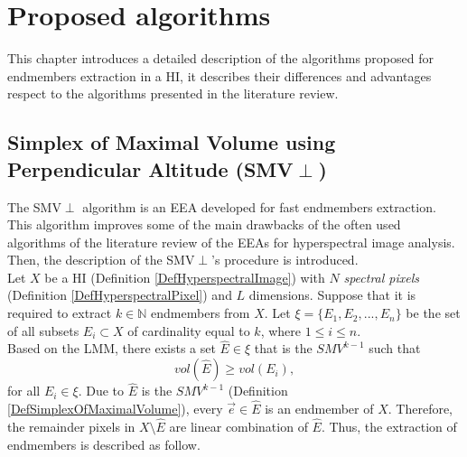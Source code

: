 \documentclass[11pt, oneside]{Thesis} %
\begin{document}

\chapter{Proposed algorithms} %

\label{ChapterAlgorithmsProposed} %


This chapter introduces a detailed description of the algorithms proposed for endmembers 
extraction in a HI, it describes their differences and advantages respect to the 
algorithms presented in the literature review.

\section{Simplex of Maximal Volume using Perpendicular Altitude (SMV$\perp$)}

\label{sectionSMVPerpDescription}

The SMV$\perp$ algorithm is an EEA developed for fast endmembers extraction. This algorithm 
improves some of the main drawbacks of the often used algorithms of the literature 
review of the EEAs for hyperspectral image analysis. Then, the description of the 
SMV$\perp$'s procedure is introduced. \\

Let $X$ be a HI (Definition \ref{DefHyperspectralImage}) with $N$ \emph{spectral pixels} 
(Definition \ref{DefHyperspectralPixel}) and $L$ dimensions. Suppose that it is required to 
extract $k \in \mathbb{N}$ endmembers from $X$. Let $\xi = \lbrace E_1,E_2,...,
E_n\rbrace$ be the set of all subsets $E_i \subset X$ of cardinality equal to $k$, 
where $1 \leq i \leq n$.\\

Based on the LMM, there exists a set $\hat{E} \in \xi$ that is the $SMV^{k-1}$ such 
that \[vol(\hat{E}) \geq vol(E_i),\] for all $E_i \in \xi$. Due to $\hat{E}$ is the 
$SMV^{k-1}$ (Definition \ref{DefSimplexOfMaximalVolume}), every $\vec{e} \in \hat{E}$ 
is an endmember of $X$. Therefore, the remainder pixels in $X \setminus \hat{E}$ are 
linear combination of $\hat{E}$. Thus, the extraction of endmembers is described as 
follow.\\
\end{document}
